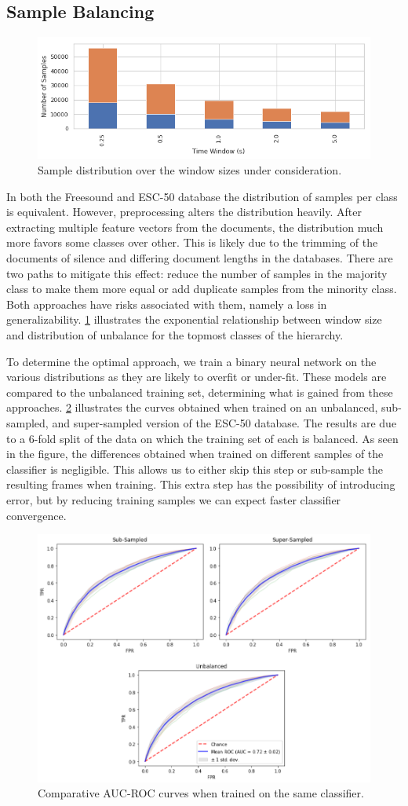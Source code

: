\subsection{Sample Balancing}
\begin{figure}[h]
    \centering
    \includegraphics[width=.45\textwidth]{figures/Sample-Distribution.png}
    \caption{Sample distribution over the window sizes under consideration.}
    \label{fig:sample-distribution}
\end{figure}
In both the Freesound and ESC-50 database the distribution of samples per class is equivalent. However, preprocessing alters the distribution heavily. After extracting multiple feature vectors from the documents, the distribution much more favors some classes over other. This is likely due to the trimming of the documents of silence and differing document lengths in the databases. There are two paths to mitigate this effect: reduce the number of samples in the majority class to make them more equal or add duplicate samples from the minority class. Both approaches have risks associated with them, namely a loss in generalizability.  \cref{fig:sample-distribution} illustrates the exponential relationship between window size and distribution of unbalance for the topmost classes of the hierarchy.

To determine the optimal approach, we train a binary neural network on the various distributions as they are likely to overfit or under-fit. These models are compared to the unbalanced training set, determining what is gained from these approaches. \cref{fig:sample-auc-roc} illustrates the curves obtained when trained on an unbalanced, sub-sampled, and super-sampled version of the ESC-50 database. The results are due to a 6-fold split of the data on which the training set of each is balanced. As seen in the figure, the differences obtained when trained on different samples of the classifier is negligible. This allows us to either skip this step or sub-sample the resulting frames when training. This extra step has the possibility of introducing error, but by reducing training samples we can expect faster classifier convergence.

\begin{figure}[h]
    \centering
    \includegraphics[width=.45\textwidth]{figures/auc-roc-sampled.png}
    \caption{Comparative AUC-ROC curves when trained on the same classifier.}
    \label{fig:sample-auc-roc}
\end{figure}

